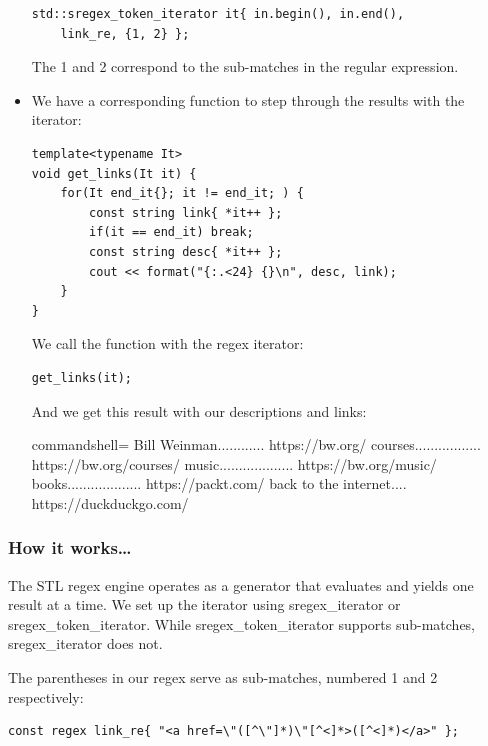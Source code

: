 \begin{itemize}
\begin{lstlisting}[style=styleCXX]
std::sregex_token_iterator it{ in.begin(), in.end(),
	link_re, {1, 2} };
\end{lstlisting}

The 1 and 2 correspond to the sub-matches in the regular expression.

\item 
We have a corresponding function to step through the results with the iterator:

\begin{lstlisting}[style=styleCXX]
template<typename It>
void get_links(It it) {
	for(It end_it{}; it != end_it; ) {
		const string link{ *it++ };
		if(it == end_it) break;
		const string desc{ *it++ };
		cout << format("{:.<24} {}\n", desc, link);
	}
}
\end{lstlisting}

We call the function with the regex iterator:

\begin{lstlisting}[style=styleCXX]
get_links(it);
\end{lstlisting}

And we get this result with our descriptions and links:

\begin{tcblisting}{commandshell={}}
Bill Weinman............ https://bw.org/
courses................. https://bw.org/courses/
music................... https://bw.org/music/
books................... https://packt.com/
back to the internet.... https://duckduckgo.com/
\end{tcblisting}
\end{itemize}

\subsubsection{How it works…}

The STL regex engine operates as a generator that evaluates and yields one result at a time. We set up the iterator using sregex\_iterator or sregex\_token\_iterator. While sregex\_token\_iterator supports sub-matches, sregex\_iterator does not.

The parentheses in our regex serve as sub-matches, numbered 1 and 2 respectively:

\begin{lstlisting}[style=styleCXX]
const regex link_re{ "<a href=\"([^\"]*)\"[^<]*>([^<]*)</a>" };
\end{lstlisting}

